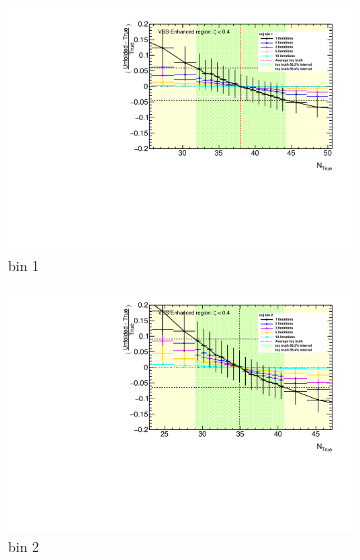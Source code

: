 \begin{figure}[htb]
    \centering
    \begin{subfigure}{.48\textwidth}
        \centering
        \includegraphics[width=.9\linewidth]{figures/Analysis/Unfolding/unfoldingbias/unfolding_bias_mjj_noFakes_VBSEnh_bin1.pdf}
        \caption{ bin 1}
    \end{subfigure}
    \begin{subfigure}{.48\textwidth}
        \centering
        \includegraphics[width=.9\linewidth]{figures/Analysis/Unfolding/unfoldingbias/unfolding_bias_mjj_noFakes_VBSEnh_bin2.pdf}
        \caption{bin 2 }
    \end{subfigure}\\
    \begin{subfigure}{.48\textwidth}
        \centering

\end{subfigure}
\end{figure}
